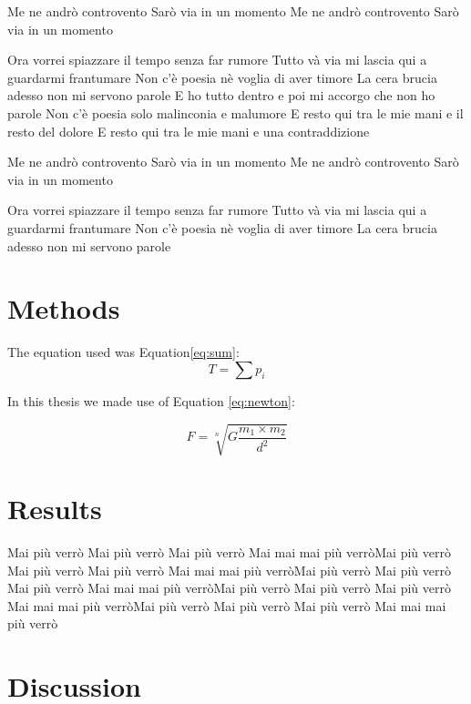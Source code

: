 Me ne andrò controvento
Sarò via in un momento
Me ne andrò controvento
Sarò via in un momento

Ora vorrei spiazzare il tempo senza far rumore
Tutto và via mi lascia qui a guardarmi frantumare
Non c'è poesia nè voglia di aver timore
La cera brucia adesso non mi servono parole
E ho tutto dentro e poi mi accorgo che non ho parole
Non c'è poesia solo malinconia e malumore
E resto qui tra le mie mani e il resto del dolore
E resto qui tra le mie mani e una contraddizione

Me ne andrò controvento
Sarò via in un momento
Me ne andrò controvento
Sarò via in un momento

Ora vorrei spiazzare il tempo senza far rumore
Tutto và via mi lascia qui a guardarmi frantumare
Non c'è poesia nè voglia di aver timore
La cera brucia adesso non mi servono parole

\section{Methods}

The equation used was Equation\ref{eq:sum}: 
\begin{equation}
    T = \sum p_i
    \label{eq:sum}
\end{equation}

In this thesis we made use of Equation \ref{eq:newton}:

\begin{equation}
    F=\sqrt[n]{G \frac{m_1 \times m_2}{d^2}}
    \label{eq:newton}
\end{equation}

\section{Results}
Mai più verrò
Mai più verrò
Mai più verrò
Mai mai mai più verròMai più verrò
Mai più verrò
Mai più verrò
Mai mai mai più verròMai più verrò
Mai più verrò
Mai più verrò
Mai mai mai più verròMai più verrò
Mai più verrò
Mai più verrò
Mai mai mai più verròMai più verrò
Mai più verrò
Mai più verrò
Mai mai mai più verrò

\section{Discussion}



